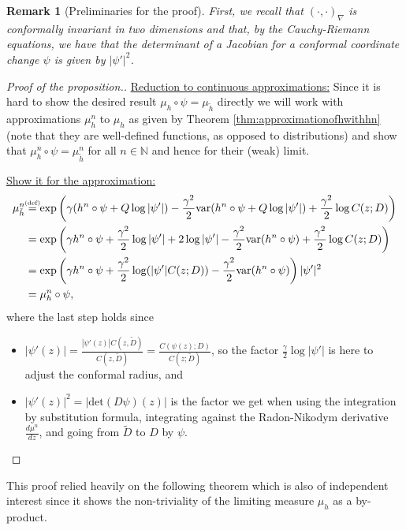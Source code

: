 \documentclass[11pt,reqno]{amsart}
\numberwithin{equation}{section}
\newtheorem{rem}[thm]{Remark}
\newcommand{\eqbydef}{\mathrel{\stackrel{\hspace*{-3mm}\text{\tiny(def)}\hspace*{-3mm}}{=}}}
\begin{document}
\begin{rem}[Preliminaries for the proof]
	First, we recall that $(\cdot,\cdot)_\nabla$ is conformally invariant in two dimensions and that, by the Cauchy-Riemann equations, we have that the determinant of a Jacobian for a conformal coordinate change $\psi$ is given by $|\psi'|^2$.
\end{rem}
\begin{proof}[Proof of the proposition.]
	\underline{Reduction to continuous approximations:} Since it is hard to show the desired result $\mu_h\circ\psi = \mu_{\tilde h}$ directly we will work with approximations $\mu_h^n$ to $\mu_h$ as given by Theorem \ref{thm:approximationofhwithhn} (note that they are well-defined functions, as opposed to distributions) and show that $\mu_h^n\circ\psi=\mu_{\tilde h}^n$ for all $n\in\mathbb N$ and hence for their (weak) limit.
	
	\underline{Show it for the approximation:}
	\begin{align*}
		\mu_{\tilde h}^n&\eqbydef
		\exp\left(\gamma(h^n\circ\psi+Q\log|\psi'|)-\frac{\gamma^2}{2}\text{var}(h^n\circ\psi+Q\log|\psi'|)+\frac{\gamma^2}{2}\log C(z;D) \right)\\
		&=\exp\left(\gamma h^n\circ\psi+\frac{\gamma^2}{2}\log|\psi'|+2\log|\psi'|-\frac{\gamma^2}{2}\text{var}(h^n\circ\psi)+\frac{\gamma^2}{2}\log C(z;D) \right)\\
		&=\exp\left(\gamma h^n\circ\psi+\frac{\gamma^2}{2}\log(|\psi'|C(z;D))-\frac{\gamma^2}{2}\text{var}(h^n\circ\psi)\right)|\psi'|^2\\
		&=\mu_h^n\circ\psi,
	\end{align*}
	where the last step holds since \begin{itemize}
		\item $|\psi'(z)|=\frac{|\psi'(z)|C(z,\tilde D)}{C(z,\tilde D)}=\frac{C(\psi(z);D)}{C(z;\tilde D)}$, so the factor $\frac{\gamma}{2}\log|\psi'|$ is here to adjust the conformal radius, and
		\item $|\psi'(z)|^2 = |\text{det}(D\psi)(z)|$ is the factor we get when using the integration by substitution formula, integrating against the Radon-Nikodym derivative $\frac{d\mu^n}{dz}$, and going from $\tilde D$ to $D$ by $\psi$.
	\end{itemize}
\end{proof}

This proof relied heavily on the following theorem which is also of independent interest since it shows the non-triviality of the limiting measure $\mu_h$ as a by-product.
\end{document}
